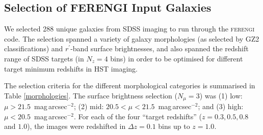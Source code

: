 \documentclass[usenatbib]{mn2e}
\newcommand{\magarc}{{\rm mag\,arcsec$^{-2}$}}
\newcommand{\ferengi}{\textsc{ferengi}}
\begin{document}
\subsection{Selection of FERENGI Input Galaxies}

We selected 288 unique galaxies from SDSS imaging to run through the \ferengi{} code. The selection spanned a variety of galaxy morphologies (as selected by GZ2 classifications) and $r^\prime$-band surface brightnesses, and also spanned the redshift range of SDSS targets (in $N_z = 4$ bins) in order to be optimised for different target minimum redshifts in HST imaging. 

The selection criteria for the different morphological categories is summarised in Table \ref{morphologies}. The surface brightness selection ($N_\mu = 3$) was (1) low: $\mu > 21.5$~\magarc;  (2) mid: $20.5 < \mu < 21.5$~\magarc; and (3) high: $\mu < 20.5$~\magarc. For each of the four ``target redshifts'' ($z = 0.3, 0.5, 0.8$ and $1.0$), the images were redshifted in $\Delta z = 0.1$ bins up to $z=1.0$. 
 
\end{document}
